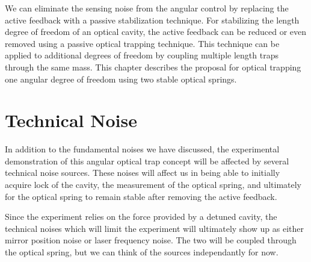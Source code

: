\acresetall




We can eliminate the sensing noise from the angular control by replacing the
active feedback with a passive stabilization technique.
For stabilizing the length degree of freedom of an optical cavity, the active
feedback can be reduced or even removed using a passive optical trapping
technique.\cite{Corbitt07}
This technique can be applied to additional degrees of freedom by coupling
multiple length traps through the same mass.
This chapter describes the proposal for optical trapping one angular degree
of freedom using two stable optical springs.









%

\section{Technical Noise}

%
%
In addition to the fundamental noises we have discussed, the
experimental demonstration of this angular optical trap concept will
be affected by several technical noise sources.
These noises will affect us in being able to initially acquire lock of the
cavity, the measurement of the optical spring, and ultimately for the optical
spring to remain stable after removing the active feedback.


Since the experiment relies on the force provided by a detuned cavity, the
technical noises which will limit the experiment will ultimately show up as
either mirror position noise or laser frequency noise.
The two will be coupled through the optical spring, but we can think of the
sources independantly for now.


